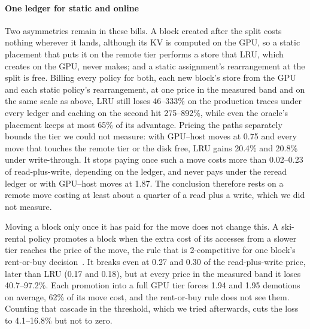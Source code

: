 \paragraph{One ledger for static and online} Two asymmetries remain in these bills. A block created after
the split costs nothing wherever it lands, although its KV is computed on the GPU, so a static placement
that puts it on the remote tier performs a store that LRU, which creates on the GPU, never makes; and a
static assignment's rearrangement at the split is free. Billing every policy for both, each new block's
store from the GPU and each static policy's rearrangement, at one price in the measured band and on the
same scale as above, LRU still loses 46--333\% on the production traces under every ledger and caching on
the second hit 275--892\%, while even the oracle's placement keeps at most 65\% of its advantage. Pricing
the paths separately bounds the tier we could not measure: with GPU--host moves at 0.75 and every move
that touches the remote tier or the disk free, LRU gains 20.4\% and 20.8\% under write-through. It stops
paying once such a move costs more than 0.02--0.23 of read-plus-write, depending on the ledger, and never
pays under the reread ledger or with GPU--host moves at 1.87. The conclusion therefore rests on a remote
move costing at least about a quarter of a read plus a write, which we did not measure.

Moving a block only once it has paid for the move does not change this. A ski-rental policy promotes a
block when the extra cost of its accesses from a slower tier reaches the price of the move, the rule that
is 2-competitive for one block's rent-or-buy decision~\cite{karlin1988snoopy}. It breaks even at 0.27 and
0.30 of the read-plus-write price, later than LRU (0.17 and 0.18), but at every price in the measured band
it loses 40.7--97.2\%. Each promotion into a full GPU tier forces 1.94 and 1.95 demotions on average, 62\% of
its move cost, and the rent-or-buy rule does not see them. Counting that cascade in the threshold, which
we tried afterwards, cuts the loss to 4.1--16.8\% but not to zero.
